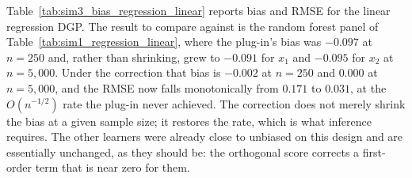 \documentclass[12pt]{article}
\begin{document}
	Table~\ref{tab:sim3_bias_regression_linear} reports bias and RMSE for the linear regression DGP. The result to compare against is the random forest panel of Table~\ref{tab:sim1_regression_linear}, where the plug-in's bias was $-0.097$ at $n=250$ and, rather than shrinking, grew to $-0.091$ for $x_1$ and $-0.095$ for $x_2$ at $n=5{,}000$. Under the correction that bias is $-0.002$ at $n=250$ and $0.000$ at $n=5{,}000$, and the RMSE now falls monotonically from $0.171$ to $0.031$, at the $O(n^{-1/2})$ rate the plug-in never achieved. The correction does not merely shrink the bias at a given sample size; it restores the rate, which is what inference requires. The other learners were already close to unbiased on this design and are essentially unchanged, as they should be: the orthogonal score corrects a first-order term that is near zero for them.
	
\end{document}
